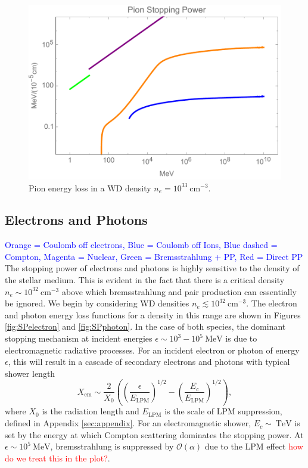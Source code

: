 \documentclass[twocolumn,showpacs,preprintnumbers,amsmath,amssymb,prd]{revtex4}
\newcommand{\OO}{\mathcal{O}}
\def\r{\right)}
\def\l{\left(}
\begin{document}
\begin{figure}
\includegraphics[scale=.45]{SPpion.pdf}
\caption{Pion energy loss in a WD density $n_e = 10^{33} ~\text{cm}^{-3}$.}
\label{fig:SPpion}
\end{figure}

\subsection{Electrons and Photons}
\textcolor{blue}{Orange = Coulomb off electrons, Blue = Coulomb off Ions, Blue dashed = Compton, Magenta = Nuclear, Green = Bremsstrahlung + PP, Red = Direct PP}
The stopping power of electrons and photons is highly sensitive to the density of the stellar medium.
This is evident in the fact that there is a critical density $n_e \sim 10^{32} ~\text{cm}^{-3}$ above which bremsstrahlung and pair production can essentially be ignored.
We begin by considering WD densities $n_e \lesssim 10^{32} ~\text{cm}^{-3}$.
The electron and photon energy loss functions for a density in this range are shown in Figures \ref{fig:SPelectron} and \ref{fig:SPphoton}.
In the case of both species, the dominant stopping mechanism at incident energies $\epsilon \sim 10^{3}-10^{5} ~\text{MeV}$ is due to electromagnetic radiative processes.
For an incident electron or photon of energy $\epsilon$, this will result in a cascade of secondary electrons and photons with typical shower length
\begin{equation}
X_\text{em} \sim \frac{2}{X_0} \l \l \frac{\epsilon}{E_\text{LPM}}\r^{1/2} - \l \frac{E_c}{E_\text{LPM}}\r^{1/2} \r,
\end{equation}
where $X_0$ is the radiation length and $E_\text{LPM}$ is the scale of LPM suppression, defined in Appendix \ref{sec:appendix}.
For an electromagnetic shower, $E_c \sim ~\text{TeV}$ is set by the energy at which Compton scattering dominates the stopping power.
At $\epsilon \sim 10^{5} ~\text{MeV}$, bremsstrahlung is suppressed by $\OO(\alpha)$ due to the LPM effect \textcolor{red}{how do we treat this in the plot?}.
\end{document}
